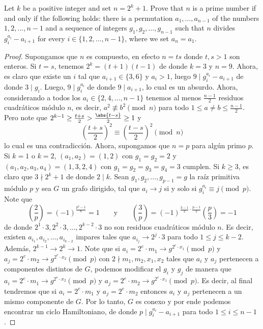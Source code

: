 
\begin{probHG}[ISL 2011/N8]
  Let $k$ be a positive integer and set $n=2^k+1$. Prove that $n$ is a prime
  number if and only if the following holds: there is a permutation
  $a_1,\dots,a_{n-1}$ of the numbers $1,2,\dots,n-1$ and a sequence of integers
  $g_1,g_2,\dots,g_{n-1}$ such that $n$ divides $g_i^{a_i}-a_{i+1}$ for every
  $i\in\{1,2,\dots,n-1\}$, where we set $a_n=a_1$.
\end{probHG}

\begin{proof}
  Supongamos que $n$ es compuesto, en efecto $n=ts$ donde $t,s>1$ son enteros.
  Si $t=s$, tenemos $2^k=(t+1)(t-1)$ de donde $k=3$ y $n=9$. Ahora, es claro que
  existe un $i$ tal que $a_{i+1}\in\{3,6\}$ y $a_i>1$, luego
  $9\mid g_i^{a_i}-a_{i+1}$ de donde $3\mid g_i$. Luego, $9\mid g_i^{a_i}$ de
  donde $9\mid a_{i+1}$, lo cual es un absurdo. Ahora, considerando a todos los
  $a_i\in\{2,4,\dots,n-1\}$ tenemos al menos $\frac{n-1}{2}$ residuos
  cuadráticos módulo $n$, es decir, $a^2\not\equiv b^2\pmod n$ para todo
  $1\le a\ne b\le\frac{n-1}{2}$. Pero note que
  $2^{k-1}\ge\frac{t+s}{2}>\frac{\abs{t-s}}{2}\ge 1$ y
  \[\left(\frac{t+s}{2}\right)^2\equiv\left(\frac{t-s}{2}\right)^2\pmod n\]
  lo cual es una contradicción. Ahora, supongamos que $n=p$ para algún primo
  $p$. Si $k=1$ o $k=2$, $(a_1,a_2)=(1,2)$ con $g_1=g_2=2$ y
  $(a_1,a_2,a_3,a_4)=(1,3,2,4)$ con $g_1=g_2=g_3=g_4=3$ cumplen. Si $k\ge 3$, es
  claro que $3\nmid 2^k+1$ de donde $2\mid k$. Sean $g_1,g_2,\dots,g_{p-1}=g$ la
  raíz primitiva módulo $p$ y sea $G$ un grafo dirigido, tal que $a_i\to j$ si y
  solo si $g_i^{a_i}\equiv j\pmod p$. Note que
  \[
    \left(\frac2p\right)=(-1)^\frac{p^2-1}{8}=1\qquad\text{y}\qquad
    \left(\frac3p\right)=(-1)^{\frac{3-1}{2}\cdot\frac{p-1}{2}}\left(\frac{p}{3}\right)=-1
  \]
  de donde $2^1\cdot 3,2^2\cdot 3,\dots,2^{k-2}\cdot 3$ no son residuos
  cuadráticos módulo $n$. Es decir, existen $a_{i_1},a_{i_2},\dots,a_{i_{k-2}}$
  impares tales que $a_{i_j}\to 2^j\cdot 3$ para todo $1\le j\le k-2$. Además,
  $2^{k-1}\to 2^k\to 1$. Note que si
  $a_i=2^e\cdot m_1\to g^{2^e\cdot x_1}\pmod p$ y
  $a_j=2^e\cdot m_2\to g^{2^e\cdot x_2}\pmod p$ con $2\nmid m_1,m_2,x_1,x_2$
  tales que $a_i$ y $a_j$ pertenecen a componentes distintos de $G$, podemos
  modificar el $g_i$ y $g_j$ de manera que
  $a_i=2^e\cdot m_1\to g^{2^e\cdot x_2}\pmod p$ y
  $a_j=2^e\cdot m_2\to g^{2^e\cdot x_1}\pmod p$. Es decir, al final tendremos
  que si $a_i=2^e\cdot m_1$ y $a_j=2^e\cdot m_2$ entonces $a_i$ y $a_j$
  pertenecen a un mismo componente de $G$. Por lo tanto, $G$ es conexo y por
  ende podemos encontrar un ciclo Hamiltoniano, de donde
  $p\mid g_i^{a_i}-a_{i+1}$ para todo $1\le i\le n-1$.
\end{proof}

